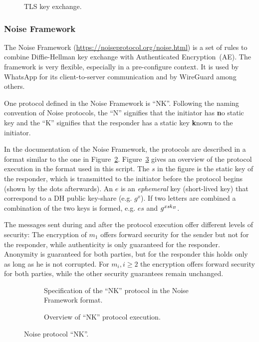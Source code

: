 \begin{figure}[!ht]
    \centering
    
    \caption{TLS key exchange.}
    \label{fig:ake:tls}
\end{figure}

\subsubsection{Noise Framework}
The Noise Framework (\url{https://noiseprotocol.org/noise.html}) is a set of rules to combine Diffie-Hellman key exchange with Authenticated Encryption~(AE).
The framework is very flexible, especially in a pre-configure context.
It is used by WhatsApp for its client-to-server communication and by WireGuard among others.

One protocol defined in the Noise Framework is ``NK''. 
Following the naming convention of Noise protocols, the ``N'' signifies that the initiator has \textbf{n}o static key and the ``K'' signifies that the responder has a static key \textbf{k}nown to the initiator.

In the documentation of the Noise Framework, the protocols are described in a format similar to the one in Figure~\ref{fig:ake:noise:nk}.
Figure~\ref{fig:ake:noise:nk_overview} gives an overview of the protocol execution in the format used in this script.
The $s$ in the figure is the static key of the responder, which is transmitted to the initiator before the protocol begins (shown by the dots afterwards).
An $e$ is an \emph{ephemeral} key (short-lived key) that correspond to a DH public key-share (e.g. $g^x$).
If two letters are combined a combination of the two keys is formed, e.g. $es$ and $g^{x\mathit{sk}_B}$.

The messages sent during and after the protocol execution offer different levels of security: 
The encryption of $m_1$ offers forward security for the sender but not for the responder, while authenticity is only guaranteed for the responder.
Anonymity is guaranteed for both parties, but for the responder this holds only as long as he is not corrupted.
For $m_i, i\geq 2$ the encryption offers forward security for both parties, while the other security guarantees remain unchanged.

\begin{figure}[!ht]
    \centering
    \begin{subfigure}{.33\textwidth}
        \centering
        
        \caption{Specification of the ``NK'' protocol in the Noise Framework format.}
        \label{fig:ake:noise:nk}
    \end{subfigure}\hfill
    \begin{subfigure}{.66\textwidth}
        \centering
        
        \caption{Overview of ``NK'' protocol execution.}
        \label{fig:ake:noise:nk_overview}
    \end{subfigure}
    \caption{Noise protocol ``NK''.}
    \label{fig:ake:noise}
\end{figure}

